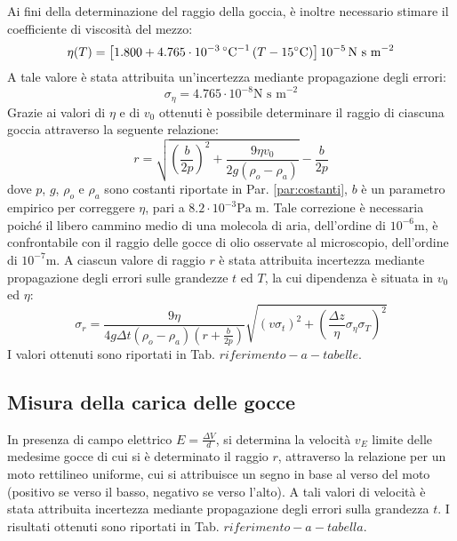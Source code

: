 \documentclass[]{article}
\let\oldsubsection\subsection%
\renewcommand{\subsection}{%
	\renewcommand{\theequation}{\thesubsection.\arabic{equation}}%
	\oldsubsection}%
\begin{document}
    Ai fini della determinazione del raggio della goccia, è inoltre necessario stimare il coefficiente di viscosità del mezzo:
    \begin{equation}
        \label{viscosita}
        \eta(T) = \left[ 1.800 + 4.765 \cdot 10^{-3} \, \degree \text{C}^{-1} \left( T - 15 \degree \text{C} \right) \right] 10^{-5} \,\text{N s m}^{-2}  
    \end{equation}
    A tale valore è stata attribuita un'incertezza mediante propagazione degli errori:
    \begin{equation}
        \label{sigma-eta}
        \sigma_{\eta}= 4.765 \cdot 10^{-8} \text{N s m}^{-2}
    \end{equation}
    Grazie ai valori di $\eta$ e di $v_0$ ottenuti è possibile determinare il raggio di ciascuna goccia attraverso la seguente relazione:
    \begin{equation}
        \label{raggio}
        r = \sqrt{\left( \frac{b}{2p} \right)^2 + \frac{9 \eta v_0}{2g \left( \rho_{o} - \rho_a\right)}} - \frac{b}{2p}
    \end{equation}
    dove $p$, $g$, $\rho_o$ e $\rho_a$ sono costanti riportate in Par. \ref{par:costanti}, $b$ è un parametro empirico per correggere $\eta$, pari a $8.2 \cdot 10^{-3} \text{Pa m}$. Tale correzione è necessaria poiché il libero cammino medio di una molecola di aria, dell'ordine di $10^{-6} \text{m}$, è confrontabile con il raggio delle gocce di olio osservate al microscopio, dell'ordine di $10^{-7} \text{m}$.
    A ciascun valore di raggio $r$ è stata attribuita incertezza mediante propagazione degli errori sulle grandezze $t$ ed $T$, la cui dipendenza è situata in $v_0$ ed $\eta$:
    \begin{equation}
        \sigma_r= \frac{9 \eta}{ 4 g \Delta t \left(\rho_o - \rho_a \right) \left(r+\frac{b}{2p} \right)} \sqrt{ \left(v \sigma_t\right)^2 + \left( \frac{\Delta z}{\eta} \sigma_{\eta} \sigma_T \right)^2}
    \end{equation}
    I valori ottenuti sono riportati in Tab. $riferimento-a-tabelle$.

    \subsection{Misura della carica delle gocce}
    \label{par:cariche-olio}
    In presenza di campo elettrico $E = \frac{\Delta V}{d}$, si determina la velocità $v_E$ limite delle medesime gocce di cui si è determinato il raggio $r$, attraverso la relazione per un moto rettilineo uniforme, cui si attribuisce un segno in base al verso del moto (positivo se verso il basso, negativo se verso l'alto). A tali valori di velocità è stata attribuita incertezza mediante propagazione degli errori sulla grandezza $t$. I risultati ottenuti sono riportati in Tab. $riferimento-a-tabella$.
    
\end{document}
